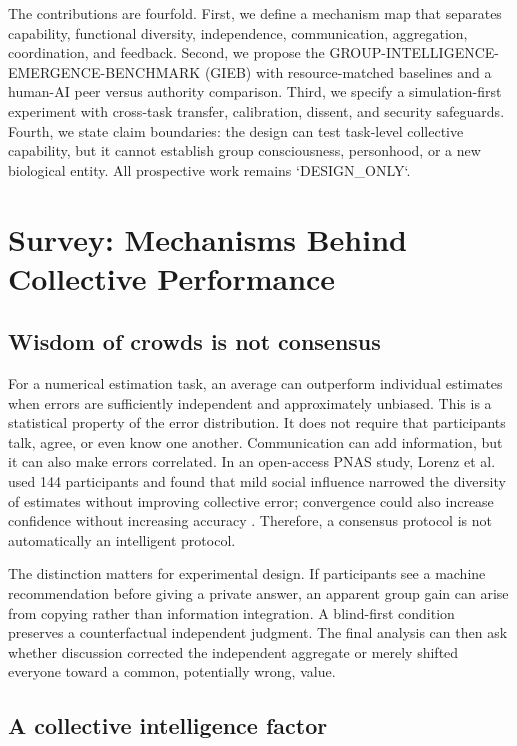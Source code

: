 \documentclass[conference]{IEEEtran}
\begin{document}
The contributions are fourfold. First, we define a mechanism map that separates capability, functional diversity, independence, communication, aggregation, coordination, and feedback. Second, we propose the GROUP-INTELLIGENCE-EMERGENCE-BENCHMARK (GIEB) with resource-matched baselines and a human-AI peer versus authority comparison. Third, we specify a simulation-first experiment with cross-task transfer, calibration, dissent, and security safeguards. Fourth, we state claim boundaries: the design can test task-level collective capability, but it cannot establish group consciousness, personhood, or a new biological entity. All prospective work remains `DESIGN\_ONLY`.

\section{Survey: Mechanisms Behind Collective Performance}

\subsection{Wisdom of crowds is not consensus}

For a numerical estimation task, an average can outperform individual estimates when errors are sufficiently independent and approximately unbiased. This is a statistical property of the error distribution. It does not require that participants talk, agree, or even know one another. Communication can add information, but it can also make errors correlated. In an open-access PNAS study, Lorenz et al. used 144 participants and found that mild social influence narrowed the diversity of estimates without improving collective error; convergence could also increase confidence without increasing accuracy \cite{lorenz2011}. Therefore, a consensus protocol is not automatically an intelligent protocol.

The distinction matters for experimental design. If participants see a machine recommendation before giving a private answer, an apparent group gain can arise from copying rather than information integration. A blind-first condition preserves a counterfactual independent judgment. The final analysis can then ask whether discussion corrected the independent aggregate or merely shifted everyone toward a common, potentially wrong, value.

\subsection{A collective intelligence factor}
\end{document}
